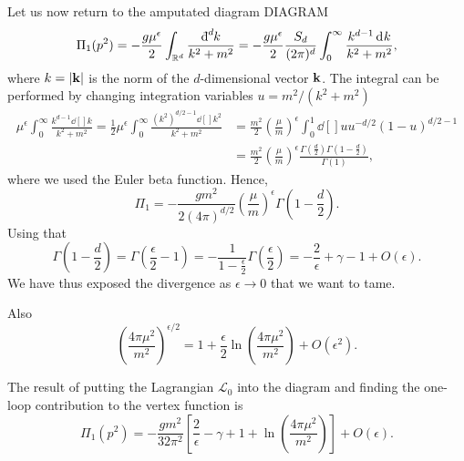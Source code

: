 Let us now return to the amputated diagram DIAGRAM
\begin{equation}
  \Pi_1(p^2) = - \frac{g \mu^\epsilon}{2} \int_{\mathbb{R}^d}^{}\frac{\bdd[d]{k}}{k^2+ m^2} = -\frac{g \mu^\epsilon}{2} \frac{S_d}{(2\pi)^d} \int_{0}^{\infty}\frac{k^{d-1} \dd[]{k}}{k^2 + m^2},
\end{equation}
where $k = \abs{\vb{k}}$ is the norm of the $d$-dimensional vector $\vb{k}$.
The integral can be performed by changing integration variables $u = m^2 / (k^2 + m^2)$
\begin{align}
  \mu^\epsilon \int_{0}^{\infty}\frac{k^{d-1}\dd[]{k}}{k^2 + m^2} = \frac{1}{2} \mu^\epsilon \int_{0}^{\infty}\frac{(k^2)^{d / 2-1}\dd[]{k^2}}{k^2 + m^2} &= \frac{m^2}{2} (\frac{\mu}{m})^\epsilon \int_{0}^{1}\dd[]{u} u^{-d / 2} (1-u)^{d / 2 - 1} \\
																			  &= \frac{m^2}{2} (\frac{\mu}{m})^\epsilon \frac{\Gamma(\frac{d}{2}) \Gamma(1 - \frac{d}{2})}{\Gamma(1)},
\end{align}
where we used the Euler beta function. Hence,
\begin{equation}
  \Pi_1 = -\frac{g m^2}{2 (4 \pi)^{d/2}} (\frac{\mu}{m})^\epsilon \Gamma(1 - \frac{d}{2}).
\end{equation}
Using that
\begin{equation}
  \Gamma(1- \frac{d}{2}) = \Gamma( \frac{\epsilon}{2} - 1) = -\frac{1}{1 - \frac{\epsilon}{2}} \Gamma(\frac{\epsilon}{2}) = -\frac{2}{\epsilon} + \gamma - 1 + O(\epsilon).
\end{equation}
We have thus exposed the divergence as $\epsilon \to 0$ that we want to tame.

Also
 \begin{equation}
   \left( \frac{4 \pi \mu^2}{m^2} \right)^{\epsilon / 2} = 1 + \frac{\epsilon}{2} \ln(\frac{4\pi \mu^2}{m^2}) + O(\epsilon^2).
\end{equation} 

The result of putting the Lagrangian $\mathscr{L}_0$ into the diagram and finding the one-loop contribution to the vertex function is
\begin{equation}
  \Pi_1(p^2) = -\frac{g m^2}{32 \pi^2} \left[ \frac{2}{\epsilon} - \gamma + 1 + \ln(\frac{4\pi\mu^2}{m^2}) \right] + O(\epsilon).
\end{equation}

